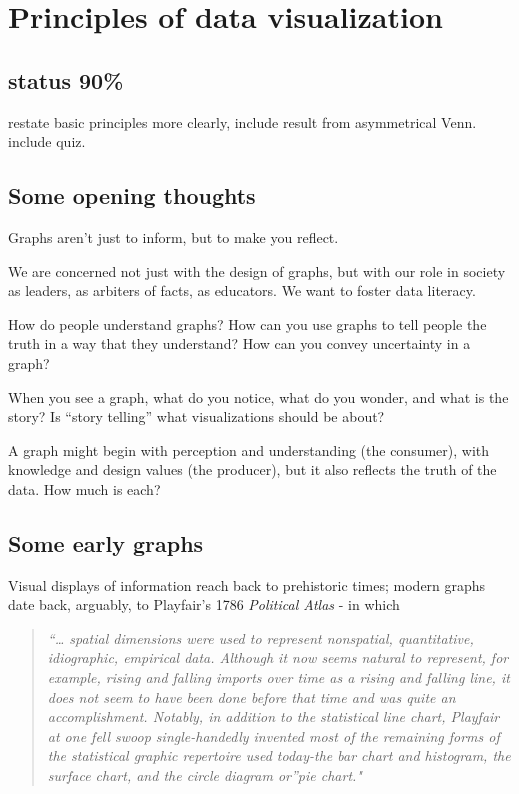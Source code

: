 \documentclass[
  openany]{book}
\begin{document}
\hypertarget{principles-of-data-visualization}{%
\chapter{Principles of data visualization}\label{principles-of-data-visualization}}

\hypertarget{status-90-3}{%
\section*{status 90\%}\label{status-90-3}}

restate basic principles more clearly, include result from asymmetrical Venn. include quiz.

\hypertarget{some-opening-thoughts}{%
\section{Some opening thoughts}\label{some-opening-thoughts}}

Graphs aren't just to inform, but to make you reflect.

We are concerned not just with the design of graphs, but with our role in society as leaders, as arbiters of facts, as educators. We want to foster data literacy.

How do people understand graphs? How can you use graphs to tell people the truth in a way that they understand? How can you convey uncertainty in a graph?

When you see a graph, what do you notice, what do you wonder, and what is the story? Is ``story telling'' what visualizations should be about?

A graph might begin with perception and understanding (the consumer), with knowledge and design values (the producer), but it also reflects the truth of the data. How much is each?

\hypertarget{some-early-graphs}{%
\section{Some early graphs}\label{some-early-graphs}}

Visual displays of information reach back to prehistoric times; modern graphs date back, arguably, to Playfair's 1786 \emph{Political Atlas} - in which

\begin{quote}
\emph{``\ldots{} spatial dimensions were used to represent nonspatial, quantitative, idiographic, empirical data. Although it now seems natural to represent, for example, rising and falling imports over time as a rising and falling line, it does not seem to have been done before that time and was quite an accomplishment. Notably, in addition to the statistical line chart, Playfair at one fell swoop single-handedly invented most of the remaining forms of the statistical graphic repertoire used today-the bar chart and histogram, the surface chart, and the circle diagram or''pie chart."} \citep{wainer1981graphical}
\end{quote}
\end{document}
